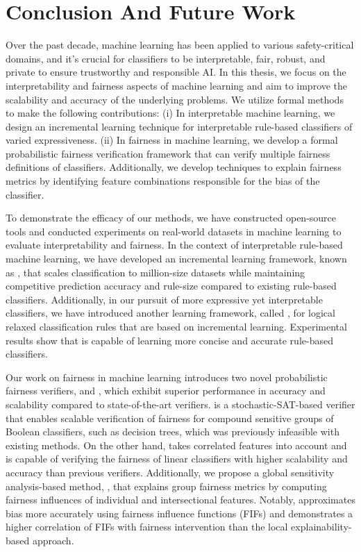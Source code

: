 \chapter{Conclusion And Future Work}
\label{chapter:conclusion} 
Over the past decade, machine learning has been applied to various safety-critical domains, and it's crucial for classifiers to be interpretable, fair, robust, and private to ensure trustworthy and responsible AI. In this thesis, we focus on the interpretability and fairness aspects of machine learning and aim to improve the scalability and accuracy of the underlying problems. We utilize formal methods to make the following contributions: (i) In interpretable machine learning, we design an incremental learning technique for interpretable rule-based classifiers of varied expressiveness. (ii) In fairness in machine learning, we develop a formal probabilistic fairness verification framework that can verify multiple fairness definitions of classifiers.  Additionally, we develop techniques to explain fairness metrics by identifying feature combinations responsible for the bias of the classifier.



To demonstrate the efficacy of our methods, we have constructed open-source tools and conducted experiments on real-world datasets in machine learning to evaluate interpretability and fairness. In the context of interpretable rule-based machine learning, we have developed an incremental learning framework, known as {\imli}, that scales classification to million-size datasets while maintaining competitive prediction accuracy and rule-size compared to existing rule-based classifiers. Additionally, in our pursuit of more expressive yet interpretable classifiers, we have introduced another learning framework, called {\crr}, for logical relaxed classification rules that are based on incremental learning. Experimental results show that {\crr} is capable of learning more concise and accurate rule-based classifiers.


Our work on fairness in machine learning introduces two novel probabilistic fairness verifiers, {\justicia} and {\fvgm}, which exhibit superior performance in accuracy and scalability compared to state-of-the-art verifiers. {\justicia} is a stochastic-SAT-based verifier that enables scalable verification of fairness for compound sensitive groups of Boolean classifiers, such as decision trees, which was previously infeasible with existing methods. On the other hand, {\fvgm} takes correlated features into account and is capable of verifying the fairness of linear classifiers with higher scalability and accuracy than previous verifiers. Additionally, we propose a global sensitivity analysis-based method, {\fairXplainer}, that explains group fairness metrics by computing fairness influences of individual and intersectional features. Notably, {\fairXplainer} approximates bias more accurately using fairness influence functions (FIFs) and demonstrates a higher correlation of FIFs with fairness intervention than the local explainability-based approach.


